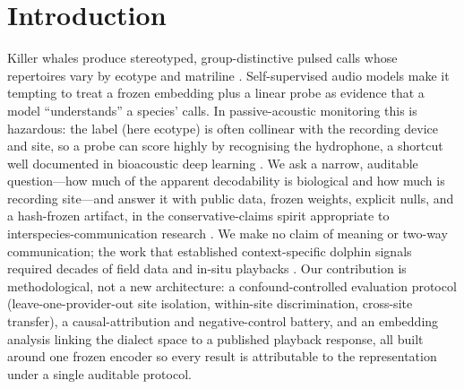 \documentclass[11pt]{article}
\begin{document}
\section{Introduction}
Killer whales produce stereotyped, group-distinctive pulsed calls whose repertoires vary
by ecotype and matriline \citep{ford1989,foote2008,filatova2015,yurk2002}. Self-supervised
audio models \citep{hagiwara2023aves,chen2022beats,robinson2024naturelm} make it tempting
to treat a frozen embedding plus a linear probe as evidence that a model ``understands'' a
species' calls. In passive-acoustic monitoring this is hazardous: the label (here ecotype)
is often collinear with the recording device and site, so a probe can score highly by
recognising the hydrophone, a shortcut well documented in bioacoustic deep learning
\citep{stowell2022,ghani2023}. We ask a narrow, auditable question---how much of the
apparent decodability is biological and how much is recording site---and answer it with
public data, frozen weights, explicit nulls, and a hash-frozen artifact, in the
conservative-claims spirit appropriate to interspecies-communication research
\citep{kershenbaum2024whyanimalstalk}. We make no claim of meaning or two-way
communication; the work that established context-specific dolphin signals required decades
of field data and in-situ playbacks \citep{sayigh2025nsw}. Our contribution is
methodological, not a new architecture: a confound-controlled evaluation protocol
(leave-one-provider-out site isolation, within-site discrimination, cross-site transfer), a
causal-attribution and negative-control battery, and an embedding analysis linking the
dialect space to a published playback response, all built around one frozen encoder so
every result is attributable to the representation under a single auditable protocol.

\vspace{-0.3em}
\end{document}
